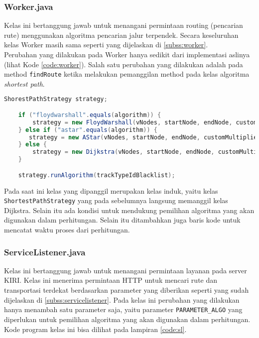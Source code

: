 \subsubsection{Worker.java}
Kelas ini bertanggung jawab untuk menangani permintaan routing (pencarian rute) menggunakan algoritma pencarian jalur terpendek. Secara keseluruhan kelas Worker masih sama seperti yang dijelaskan di \ref{subss:worker}.
\\
Perubahan yang dilakukan pada Worker hanya sedikit dari implementasi aslinya (lihat Kode \ref{code:worker}). Salah satu perubahan yang dilakukan adalah pada method \texttt{findRoute} ketika melakukan pemanggilan method pada kelas algoritma \textit{shortest path}.
\begin{lstlisting}[language=Java, caption=Worker.java, basicstyle=\small\ttfamily]
    ShorestPathStrategy strategy;

    if ("floydwarshall".equals(algorithm)) {
        strategy = new FloydWarshall(vNodes, startNode, endNode, customMultiplierWalking, customPenaltyTransfer);
	} else if ("astar".equals(algorithm)) {
	   strategy = new AStar(vNodes, startNode, endNode, customMultiplierWalking, customPenaltyTransfer);
	} else {
		strategy = new Dijkstra(vNodes, startNode, endNode, customMultiplierWalking, customPenaltyTransfer);
	}

    strategy.runAlgorithm(trackTypeIdBlacklist);
\end{lstlisting}
\noindent
Pada saat ini kelas yang dipanggil merupakan kelas induk, yaitu kelas \texttt{ShortestPathStrategy} yang pada sebelumnya langsung memanggil kelas Dijkstra. Selain itu ada kondisi untuk mendukung pemilihan algoritma yang akan digunakan dalam perhitungan. Selain itu ditambahkan juga baris kode untuk mencatat waktu proses dari perhitungan.

\subsubsection{ServiceListener.java}
Kelas ini bertanggung jawab untuk menangani permintaan layanan pada server KIRI. Kelas ini menerima permintaan HTTP untuk mencari rute dan transportasi terdekat berdasarkan parameter yang diberikan seperti yang sudah dijelaskan di \ref{subss:servicelistener}. Pada kelas ini perubahan yang dilakukan hanya menambah satu parameter saja, yaitu parameter \texttt{PARAMETER\_ALGO} yang diperlukan untuk pemilihan algoritma yang akan digunakan dalam perhitungan. Kode program kelas ini bisa dilihat pada lampiran \ref{code:sl}.


